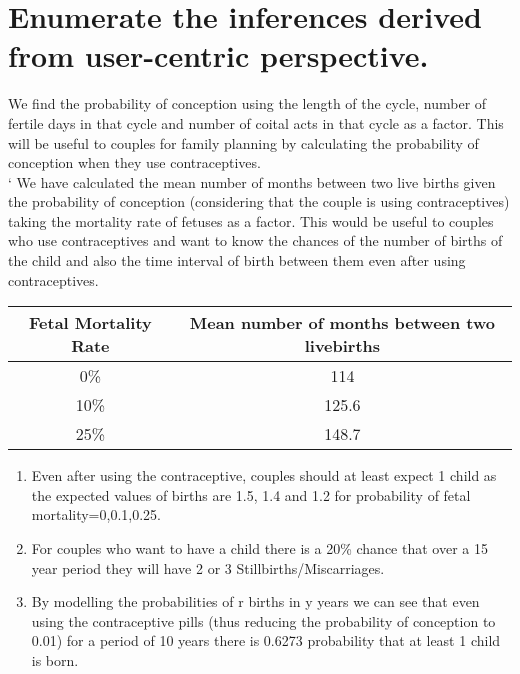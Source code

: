 \documentclass{article}
\begin{document}
\section{Enumerate the inferences derived from user-centric perspective.}
We find the probability of conception using the length of the cycle, number of fertile days in that cycle and number of coital acts in that cycle as a factor. This will be useful to couples for family planning by calculating the probability of conception when they use contraceptives.\\
`
We have calculated the mean number of months between two live births given the probability of conception (considering that the couple is using contraceptives) taking the mortality rate of fetuses as a factor. This would be useful to couples who use contraceptives and want to know the chances of the number of births of the child and also the time interval of birth between them even after using contraceptives.\\
	\begin{table}[h]
		\begin{center}
			\begin{tabular}{|c|c|}
				\hline
				Fetal Mortality Rate  & Mean number of months between two livebirths\\ \hline
				0\% & 114     \\ \hline
				10\% & 125.6 \\ \hline
				25\% & 148.7 \\ \hline
			\end{tabular}
		\end{center}
	\end{table}


\begin{enumerate}
\item Even after using the contraceptive, couples should at least expect 1 child as the expected values of births are 1.5, 1.4 and 1.2 for probability of fetal mortality=0,0.1,0.25.
\item For couples who want to have a child there is a 20\% chance that over a 15 year period they will have 2 or 3 Stillbirths/Miscarriages.
\item By modelling the probabilities of r births in y years we can see that even using the contraceptive pills (thus reducing the probability of conception to 0.01) for a period of 10 years there is 0.6273 probability that at least 1 child is born.
\end{enumerate} 




\end{document}
